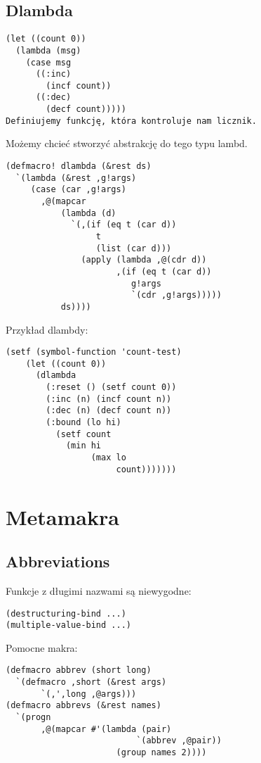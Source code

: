 \subsection{Dlambda}
\begin{frame}[fragile]{}
\begin{verbatim}
(let ((count 0))
  (lambda (msg)
    (case msg
      ((:inc)
        (incf count))
      ((:dec)
        (decf count)))))
Definiujemy funkcję, która kontroluje nam licznik.
\end{verbatim}
\pause
Możemy chcieć stworzyć abstrakcję do tego typu lambd.
\end{frame}

\begin{frame}[fragile]{}
\begin{verbatim}
(defmacro! dlambda (&rest ds)
  `(lambda (&rest ,g!args)
     (case (car ,g!args)
       ,@(mapcar
           (lambda (d)
             `(,(if (eq t (car d))
                  t
                  (list (car d)))
               (apply (lambda ,@(cdr d))
                      ,(if (eq t (car d))
                         g!args
                         `(cdr ,g!args)))))
           ds))))
\end{verbatim}
\end{frame}

\begin{frame}[fragile]{}
Przykład dlambdy:
\begin{verbatim}
(setf (symbol-function 'count-test)
    (let ((count 0))
      (dlambda
        (:reset () (setf count 0))
        (:inc (n) (incf count n))
        (:dec (n) (decf count n))
        (:bound (lo hi)
          (setf count
            (min hi
                 (max lo
                      count)))))))
\end{verbatim}
\end{frame}

\section{Metamakra}
\begin{frame}{}
\end{frame}

\subsection{Abbreviations}
\begin{frame}[fragile]{}
Funkcje z długimi nazwami są niewygodne:
\begin{verbatim}
(destructuring-bind ...)
(multiple-value-bind ...)
\end{verbatim}
Pomocne makra:
\begin{verbatim}
(defmacro abbrev (short long)
  `(defmacro ,short (&rest args)
       `(,',long ,@args)))
(defmacro abbrevs (&rest names)
  `(progn
       ,@(mapcar #'(lambda (pair)
                          `(abbrev ,@pair))
               	      (group names 2))))
\end{verbatim}
\end{frame}

